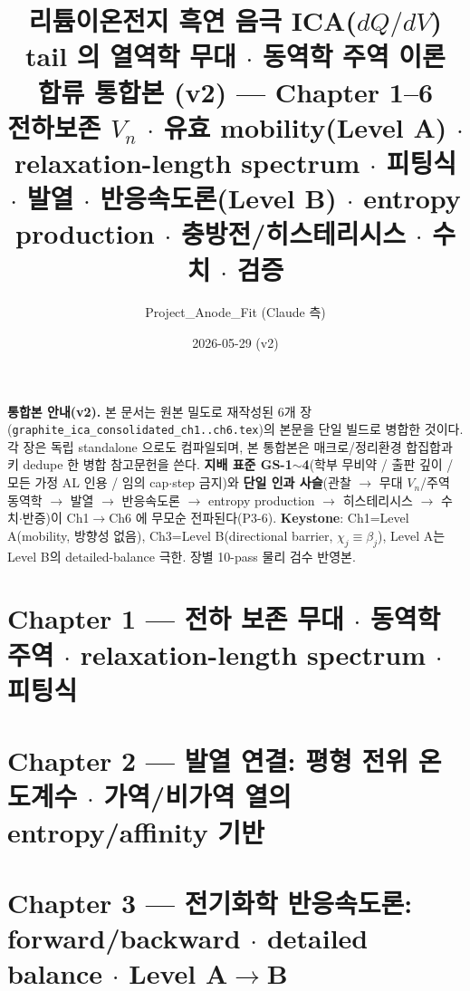 \documentclass[11pt,a4paper]{article}
\title{\textbf{리튬이온전지 흑연 음극 ICA($dQ/dV$) tail 의 열역학 무대 $\cdot$ 동역학 주역 이론}\\[0.4em]
\large 합류 통합본 (v2) — Chapter 1--6\\[0.2em]
\normalsize 전하보존 $V_n$ $\cdot$ 유효 mobility(Level A) $\cdot$ relaxation-length spectrum $\cdot$ 피팅식 $\cdot$
발열 $\cdot$ 반응속도론(Level B) $\cdot$ entropy production $\cdot$ 충방전/히스테리시스 $\cdot$ 수치 $\cdot$ 검증}
\author{Project\_Anode\_Fit (Claude 측)}
\date{2026-05-29 (v2)}
\begin{document}
\maketitle

\begin{mdframed}
\textbf{통합본 안내(v2).} 본 문서는 원본 밀도로 재작성된 6개 장(\texttt{graphite\_ica\_consolidated\_ch1..ch6.tex})의
본문을 단일 빌드로 병합한 것이다. 각 장은 독립 standalone 으로도 컴파일되며, 본 통합본은 매크로/정리환경
합집합과 키 dedupe 한 병합 참고문헌을 쓴다. \textbf{지배 표준 GS-1$\sim$4}(학부 무비약 / 출판 깊이 / 모든
가정 AL 인용 / 임의 cap$\cdot$step 금지)와 \textbf{단일 인과 사슬}(관찰 $\to$ 무대 $V_n$/주역 동역학 $\to$
발열 $\to$ 반응속도론 $\to$ entropy production $\to$ 히스테리시스 $\to$ 수치$\cdot$반증)이 Ch1$\to$Ch6 에
무모순 전파된다(P3-6). \textbf{Keystone}: Ch1=Level A(mobility, 방향성 없음), Ch3=Level B(directional
barrier, $\chi_j\equiv\beta_j$), Level A는 Level B의 detailed-balance 극한. 장별 10-pass 물리 검수 반영본.
\end{mdframed}

\tableofcontents
\clearpage

\part*{Chapter 1 — 전하 보존 무대 $\cdot$ 동역학 주역 $\cdot$ relaxation-length spectrum $\cdot$ 피팅식}
\setcounter{section}{0}
\renewcommand{\thesection}{1.\arabic{section}}
\renewcommand{\thesubsection}{1.\arabic{section}.\arabic{subsection}}

\clearpage

\part*{Chapter 2 — 발열 연결: 평형 전위 온도계수 $\cdot$ 가역/비가역 열의 entropy/affinity 기반}
\setcounter{section}{0}
\renewcommand{\thesection}{2.\arabic{section}}
\renewcommand{\thesubsection}{2.\arabic{section}.\arabic{subsection}}

\clearpage

\part*{Chapter 3 — 전기화학 반응속도론: forward/backward $\cdot$ detailed balance $\cdot$ Level A$\to$B}
\setcounter{section}{0}
\renewcommand{\thesection}{3.\arabic{section}}
\renewcommand{\thesubsection}{3.\arabic{section}.\arabic{subsection}}

\clearpage
\end{document}
